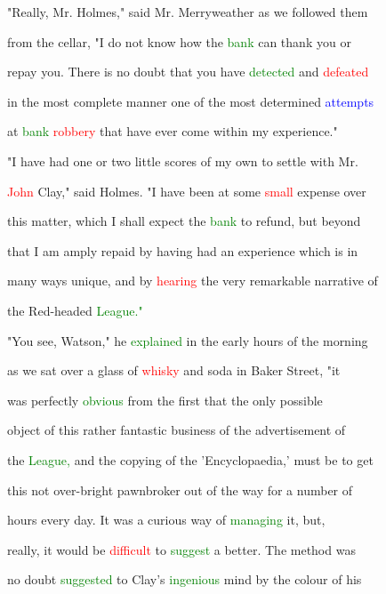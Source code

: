  "Really, Mr. Holmes," said Mr. Merryweather as we followed them

 from the cellar, "I do not know how the \textcolor{green}{bank} can thank you or

 \textcolor{BurntOrange}{repay} you. There is no \textcolor{BurntOrange}{doubt} that you have \textcolor{green}{detected} and \textcolor{red}{defeated}

 in the most complete manner one of the most determined \textcolor{blue}{attempts}

 at \textcolor{green}{bank} \textcolor{red}{robbery} that have ever come within my experience."



 "I have had one or two little \textcolor{BurntOrange}{scores} of my own to settle with Mr.

 \textcolor{red}{John} Clay," said Holmes. "I have been at some \textcolor{red}{small} expense over

 this matter, which I shall \textcolor{BurntOrange}{expect} the \textcolor{green}{bank} to refund, but beyond

 that I am amply repaid by having had an experience which is in

 many ways \textcolor{BurntOrange}{unique,} and by \textcolor{red}{hearing} the very \textcolor{BurntOrange}{remarkable} narrative of

 the Red-headed \textcolor{green}{League."}





 "You see, Watson," he \textcolor{green}{explained} in the early hours of the morning

 as we sat over a glass of \textcolor{red}{whisky} and soda in Baker Street, "it

 was perfectly \textcolor{green}{obvious} from the first that the only possible

 object of this rather fantastic business of the advertisement of

 the \textcolor{green}{League,} and the copying of the 'Encyclopaedia,' must be to get

 this not over-bright pawnbroker out of the way for a number of

 hours every day. It was a curious way of \textcolor{green}{managing} it, but,

 really, it would be \textcolor{red}{difficult} to \textcolor{green}{suggest} a better. The method was

 no \textcolor{BurntOrange}{doubt} \textcolor{green}{suggested} to Clay's \textcolor{green}{ingenious} mind by the colour of his

